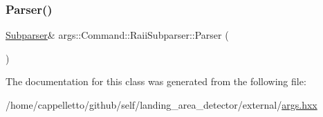 \subsubsection{\texorpdfstring{Parser()}{Parser()}}
{\footnotesize\ttfamily \hyperlink{classargs_1_1_subparser}{Subparser}\& args\+::\+Command\+::\+Raii\+Subparser\+::\+Parser (\begin{DoxyParamCaption}{ }\end{DoxyParamCaption})\hspace{0.3cm}{\ttfamily [inline]}}



The documentation for this class was generated from the following file\+:\begin{DoxyCompactItemize}
\item 
/home/cappelletto/github/self/landing\+\_\+area\+\_\+detector/external/\hyperlink{args_8hxx}{args.\+hxx}\end{DoxyCompactItemize}
